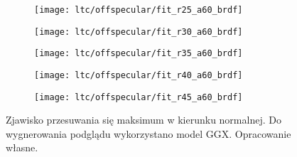 \documentclass[../main.tex]{subfiles}
\begin{document}
\begin{figure}
    \centering
    
    \begin{subfigure}[t]{0.18\textwidth}
        \texttt{[image: ltc/offspecular/fit\_r25\_a60\_brdf]}
    \end{subfigure}
    \begin{subfigure}[t]{0.18\textwidth}
        \texttt{[image: ltc/offspecular/fit\_r30\_a60\_brdf]}
    \end{subfigure}
    \begin{subfigure}[t]{0.18\textwidth}
        \texttt{[image: ltc/offspecular/fit\_r35\_a60\_brdf]}
    \end{subfigure}
    \begin{subfigure}[t]{0.18\textwidth}
        \texttt{[image: ltc/offspecular/fit\_r40\_a60\_brdf]}
    \end{subfigure}
    \begin{subfigure}[t]{0.18\textwidth}
        \texttt{[image: ltc/offspecular/fit\_r45\_a60\_brdf]}
    \end{subfigure}
    
    \caption{Zjawisko przesuwania się maksimum w kierunku normalnej. Do wygnerowania podglądu wykorzystano model GGX. Opracowanie własne.}
    \label{fig:BRDFOffSpecular}
\end{figure}
\end{document}
